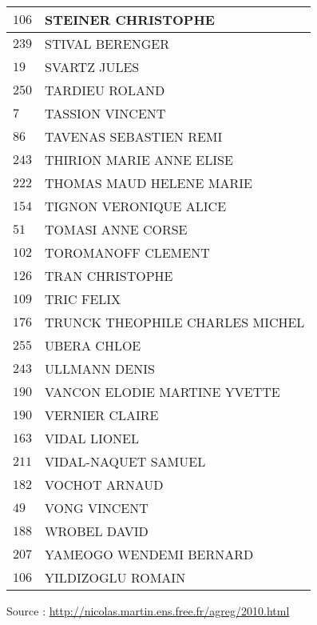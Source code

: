 \begin{xltabular}{\linewidth}{|l|X|}
    \hline
    $106$ & STEINER CHRISTOPHE \\
    \hline
    $239$ & STIVAL BERENGER \\
    \hline
    $19$ & SVARTZ JULES \\
    \hline
    $250$ & TARDIEU ROLAND \\
    \hline
    $7$ & TASSION VINCENT \\
    \hline
    $86$ & TAVENAS SEBASTIEN REMI \\
    \hline
    $243$ & THIRION MARIE ANNE ELISE \\
    \hline
    $222$ & THOMAS MAUD HELENE MARIE \\
    \hline
    $154$ & TIGNON VERONIQUE ALICE \\
    \hline
    $51$ & TOMASI ANNE CORSE \\
    \hline
    $102$ & TOROMANOFF CLEMENT \\
    \hline
    $126$ & TRAN CHRISTOPHE \\
    \hline
    $109$ & TRIC FELIX \\
    \hline
    $176$ & TRUNCK THEOPHILE CHARLES MICHEL \\
    \hline
    $255$ & UBERA CHLOE \\
    \hline
    $243$ & ULLMANN DENIS \\
    \hline
    $190$ & VANCON ELODIE MARTINE YVETTE \\
    \hline
    $190$ & VERNIER CLAIRE \\
    \hline
    $163$ & VIDAL LIONEL \\
    \hline
    $211$ & VIDAL-NAQUET SAMUEL \\
    \hline
    $182$ & VOCHOT ARNAUD \\
    \hline
    $49$ & VONG VINCENT \\
    \hline
    $188$ & WROBEL DAVID \\
    \hline
    $207$ & YAMEOGO WENDEMI BERNARD \\
    \hline
    $106$ & YILDIZOGLU ROMAIN \\
    \hline
  \end{xltabular}

  \begin{flushright}
    {\tiny Source : \url{http://nicolas.martin.ens.free.fr/agreg/2010.html}}
  \end{flushright}

